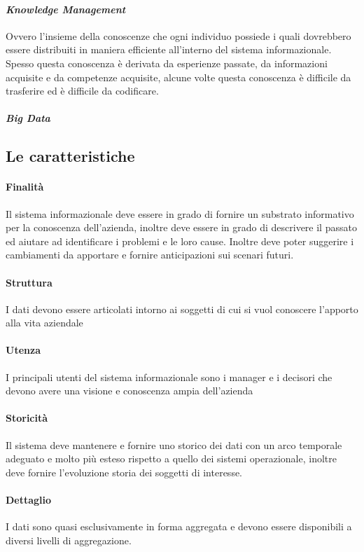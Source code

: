         \paragraph{\textit{Knowledge Management}} Ovvero l'insieme della conoscenze che ogni individuo possiede i quali dovrebbero essere distribuiti in maniera efficiente all'interno del sistema informazionale. Spesso questa conoscenza è derivata da esperienze passate, da informazioni acquisite e da competenze acquisite, alcune volte questa conoscenza è difficile da trasferire ed è difficile da codificare.
        \paragraph{\textit{Big Data}}
    \subsection{Le caratteristiche}
        \paragraph{Finalità} Il sistema informazionale deve essere in grado di fornire un substrato informativo per la conoscenza dell'azienda, inoltre deve essere in grado di descrivere il passato ed aiutare ad identificare i problemi e le loro cause. Inoltre deve poter suggerire i cambiamenti da apportare e fornire anticipazioni sui scenari futuri.
        \paragraph{Struttura} I dati devono essere articolati intorno ai soggetti di cui si vuol conoscere l'apporto alla vita aziendale
        \paragraph{Utenza} I principali utenti del sistema informazionale sono i manager e i decisori che devono avere una visione e conoscenza ampia dell'azienda
        \paragraph{Storicità} Il sistema deve mantenere e fornire uno storico dei dati con un arco temporale adeguato e molto più esteso rispetto a quello dei sistemi operazionale, inoltre deve fornire l'evoluzione storia dei soggetti di interesse.
        \paragraph{Dettaglio} I dati sono quasi esclusivamente in forma aggregata e devono essere disponibili a diversi livelli di aggregazione.
